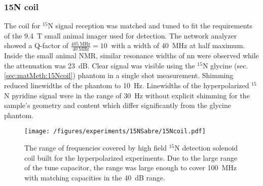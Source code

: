         \subsubsection{15N coil}
    The coil for $^{15}$N signal reception was matched and tuned to fit the requirements of the \SI{9.4}{\tesla} small animal imager used for detection. The network analyzer showed a Q-factor of $\frac{\SI{405}{\mega\hertz}}{\SI{40}{\mega\hertz}} = \SI{10}{}$ with a width of \SI{40}{\mega\hertz} at half maximum. Inside the small animal NMR, similar resonance widths of nn were observed while the attenuation was \SI{23}{\deci\bel}. Clear signal was visible using the $^{15}$N glycine (sec. \ref{sec:matMeth:15Ncoil}) phantom in a single shot measurement. Shimming reduced linewidths of the phantom to \SI{10}{\hertz}. Linewidths of the hyperpolarized $^{15}$N pyridine signal were in the range of \SI{30}{\hertz} without explicit shimming for the sample's geometry and content which differ significantly from the glycine phantom.
                \begin{figure}
                    \texttt{[image: /figures/experiments/15NSabre/15Ncoil.pdf]}
                    \caption[15N coil network analysis]{The range of frequencies covered by high field $^{15}$N detection solenoid coil built for the hyperpolarized experiments. Due to the large range of the tune capacitor, the range was large enough to cover \SI{100}{\mega\hertz} with matching capacities in the \SI{40}{\deci\bel} range.}
                    \label{fig:results:15N:networkAnalysisCoil}
                \end{figure}
